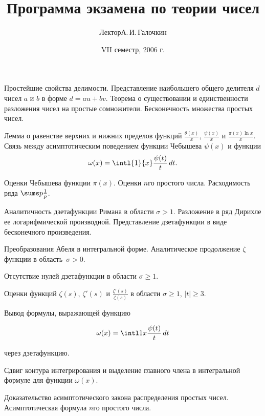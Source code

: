 \documentclass[a4paper,draft]{article}
\title{Программа экзамена по теории чисел}
\author{Лектор\т А.\,И.\,Галочкин}
\date{VII семестр, 2006 г.}
\begin{document}
\maketitle

\begin{nums}{0}
\item Простейшие свойства делимости. Представление наибольшего общего
делителя $d$ чисел $a$ и  $b$ в форме  $d=au+bv$. Теорема о
существовании и единственности разложения чисел на простые
сомножители. Бесконечность множества простых чисел.

\item Лемма о равенстве верхних и нижних пределов функций
$\frac{\theta (x)}{x}$, $\frac{\psi (x)}{x}$ и $\frac{\pi (x) \ln x}{x}$. Связь между
асимптотическим поведением функции Чебышева $\psi (x)$ и функции
$$ \omega (x)=  \intl{1}{x} \frac {\psi (t)}{t} \, dt.$$

\item Оценки Чебышева функции  $\pi (x)$. Оценки $n$\д го простого
числа. Расходимость ряда $ {\sums p \frac 1p}$.

\item Аналитичность дзета\д функции Римана в области $\sigma >1$.
Разложение в ряд Дирихле ее логарифмической производной.
Представление дзета\д функции в виде бесконечного произведения.

\item Преобразования Абеля в интегральной форме. Аналитическое
продолжение $\zeta$\д функции в область~${\sigma >0}$.

\item Отсутствие нулей дзета\д функции в области $\sigma \ge 1$.

\item Оценки функций $\zeta (s)$, $\zeta '(s)$  и $\frac{\zeta'(s)}{\zeta (s)}$ в области $\sigma \ge 1$, $|t| \ge 3$.

\item Вывод формулы, выражающей функцию

$$ \omega (x)= \intl 1x \frac {\psi (t)}{t} \, dt$$

через дзета\д функцию.

\item Сдвиг контура интегрирования и выделение главного члена в
интегральной формуле для функции    $\omega (x)$.

\item Доказательство асимптотического закона распределения простых
чисел. Асимптотическая формула   $n$\д го простого числа.


\end{nums}
\end{document}
